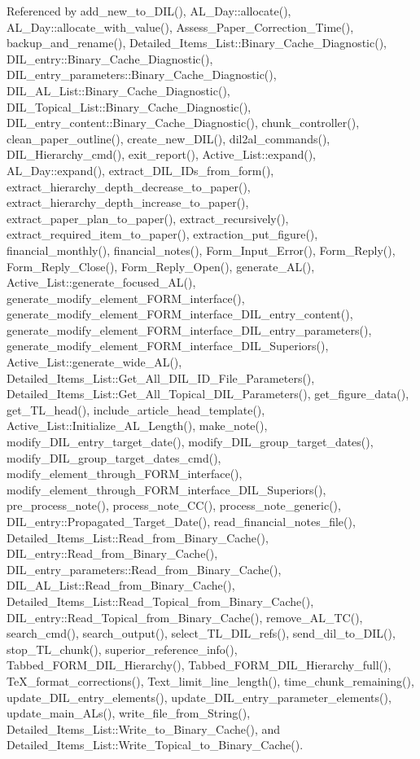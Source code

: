 Referenced by add\_\-new\_\-to\_\-DIL(), AL\_\-Day::allocate(), AL\_\-Day::allocate\_\-with\_\-value(), Assess\_\-Paper\_\-Correction\_\-Time(), backup\_\-and\_\-rename(), Detailed\_\-Items\_\-List::Binary\_\-Cache\_\-Diagnostic(), DIL\_\-entry::Binary\_\-Cache\_\-Diagnostic(), DIL\_\-entry\_\-parameters::Binary\_\-Cache\_\-Diagnostic(), DIL\_\-AL\_\-List::Binary\_\-Cache\_\-Diagnostic(), DIL\_\-Topical\_\-List::Binary\_\-Cache\_\-Diagnostic(), DIL\_\-entry\_\-content::Binary\_\-Cache\_\-Diagnostic(), chunk\_\-controller(), clean\_\-paper\_\-outline(), create\_\-new\_\-DIL(), dil2al\_\-commands(), DIL\_\-Hierarchy\_\-cmd(), exit\_\-report(), Active\_\-List::expand(), AL\_\-Day::expand(), extract\_\-DIL\_\-IDs\_\-from\_\-form(), extract\_\-hierarchy\_\-depth\_\-decrease\_\-to\_\-paper(), extract\_\-hierarchy\_\-depth\_\-increase\_\-to\_\-paper(), extract\_\-paper\_\-plan\_\-to\_\-paper(), extract\_\-recursively(), extract\_\-required\_\-item\_\-to\_\-paper(), extraction\_\-put\_\-figure(), financial\_\-monthly(), financial\_\-notes(), Form\_\-Input\_\-Error(), Form\_\-Reply(), Form\_\-Reply\_\-Close(), Form\_\-Reply\_\-Open(), generate\_\-AL(), Active\_\-List::generate\_\-focused\_\-AL(), generate\_\-modify\_\-element\_\-FORM\_\-interface(), generate\_\-modify\_\-element\_\-FORM\_\-interface\_\-DIL\_\-entry\_\-content(), generate\_\-modify\_\-element\_\-FORM\_\-interface\_\-DIL\_\-entry\_\-parameters(), generate\_\-modify\_\-element\_\-FORM\_\-interface\_\-DIL\_\-Superiors(), Active\_\-List::generate\_\-wide\_\-AL(), Detailed\_\-Items\_\-List::Get\_\-All\_\-DIL\_\-ID\_\-File\_\-Parameters(), Detailed\_\-Items\_\-List::Get\_\-All\_\-Topical\_\-DIL\_\-Parameters(), get\_\-figure\_\-data(), get\_\-TL\_\-head(), include\_\-article\_\-head\_\-template(), Active\_\-List::Initialize\_\-AL\_\-Length(), make\_\-note(), modify\_\-DIL\_\-entry\_\-target\_\-date(), modify\_\-DIL\_\-group\_\-target\_\-dates(), modify\_\-DIL\_\-group\_\-target\_\-dates\_\-cmd(), modify\_\-element\_\-through\_\-FORM\_\-interface(), modify\_\-element\_\-through\_\-FORM\_\-interface\_\-DIL\_\-Superiors(), pre\_\-process\_\-note(), process\_\-note\_\-CC(), process\_\-note\_\-generic(), DIL\_\-entry::Propagated\_\-Target\_\-Date(), read\_\-financial\_\-notes\_\-file(), Detailed\_\-Items\_\-List::Read\_\-from\_\-Binary\_\-Cache(), DIL\_\-entry::Read\_\-from\_\-Binary\_\-Cache(), DIL\_\-entry\_\-parameters::Read\_\-from\_\-Binary\_\-Cache(), DIL\_\-AL\_\-List::Read\_\-from\_\-Binary\_\-Cache(), Detailed\_\-Items\_\-List::Read\_\-Topical\_\-from\_\-Binary\_\-Cache(), DIL\_\-entry::Read\_\-Topical\_\-from\_\-Binary\_\-Cache(), remove\_\-AL\_\-TC(), search\_\-cmd(), search\_\-output(), select\_\-TL\_\-DIL\_\-refs(), send\_\-dil\_\-to\_\-DIL(), stop\_\-TL\_\-chunk(), superior\_\-reference\_\-info(), Tabbed\_\-FORM\_\-DIL\_\-Hierarchy(), Tabbed\_\-FORM\_\-DIL\_\-Hierarchy\_\-full(), Te\-X\_\-format\_\-corrections(), Text\_\-limit\_\-line\_\-length(), time\_\-chunk\_\-remaining(), update\_\-DIL\_\-entry\_\-elements(), update\_\-DIL\_\-entry\_\-parameter\_\-elements(), update\_\-main\_\-ALs(), write\_\-file\_\-from\_\-String(), Detailed\_\-Items\_\-List::Write\_\-to\_\-Binary\_\-Cache(), and Detailed\_\-Items\_\-List::Write\_\-Topical\_\-to\_\-Binary\_\-Cache().

